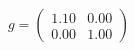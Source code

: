 \documentclass[preview]{standalone}
\begin{document}
\begin{align*}
g = \begin{pmatrix} 1.10 & 0.00 \\ 0.00 & 1.00 \end{pmatrix}
\end{align*}
\end{document}
